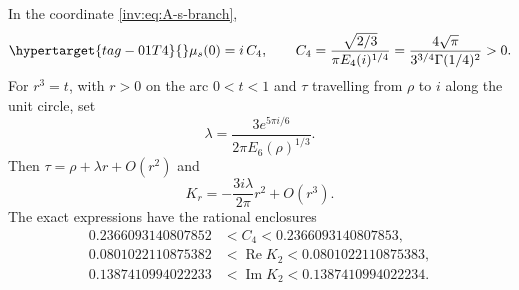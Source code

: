 \begin{proposition}\hypertarget{tag-01RV}{}\label{inv:A2.2}

In the coordinate \eqref{inv:eq:A-s-branch},
\begin{equation}\hypertarget{tag-01T4}{}\label{inv:eq:A-mu-value}
\mu_s(0)=i\,C_4,
\qquad
C_4=\frac{\sqrt{2/3}}{\pi E_4(i)^{1/4}}
=\frac{4\sqrt\pi}{3^{3/4}\Gamma(1/4)^2}>0.
\end{equation}
For $r^3=t$, with $r>0$ on the arc $0<t<1$ and $\tau$ travelling
from $\rho$ to $i$ along the unit circle, set
\[
\lambda=\frac{3e^{5\pi i/6}}{2\pi E_6(\rho)^{1/3}}.
\]
Then $\tau=\rho+\lambda r+O(r^2)$ and
\[
K_r=-\frac{3i\lambda}{2\pi}r^2+O(r^3).
\]
The exact expressions have the rational enclosures
\[
\begin{aligned}
0.2366093140807852&<C_4<0.2366093140807853,\\
0.0801022110875382&<\operatorname{Re}K_2<0.0801022110875383,\\
0.1387410994022233&<\operatorname{Im}K_2<0.1387410994022234.
\end{aligned}
\]
\end{proposition}


